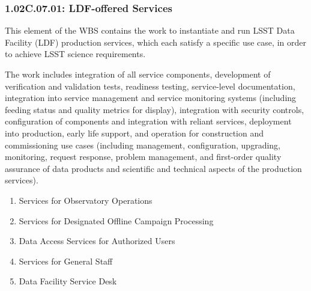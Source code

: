 \subsubsection*{1.02C.07.01: LDF-offered Services}

This element of the WBS contains the work to instantiate and run LSST Data Facility (LDF) production services, which each satisfy a specific use case, in order to achieve LSST science requirements.

The work includes integration of all service components, development of verification and validation tests, readiness testing, service-level documentation, integration into service management and service monitoring systems (including feeding status and quality metrics for display), integration with security controls, configuration of components and integration with reliant services, deployment into production, early life support, and operation for construction and commissioning use cases (including management, configuration, upgrading, monitoring, request response, problem management, and first-order quality assurance of data products and scientific and technical aspects of the production services).

\begin{enumerate}

  \item{Services for Observatory Operations}
  \item{Services for Designated Offline Campaign Processing}
  \item{Data Access Services for Authorized Users}
  \item{Services for General Staff}
  \item{Data Facility Service Desk}

\end{enumerate}


